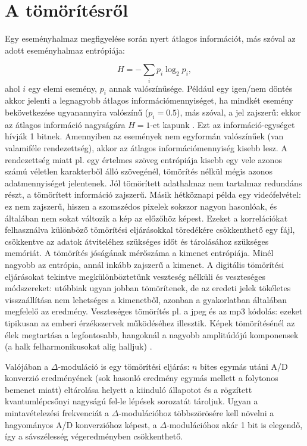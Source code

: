 \documentclass[12pt]{article}
\theoremstyle{plain}
\begin{document}
\section{A tömörítésről}

Egy eseményhalmaz megfigyelése során nyert átlagos információt, más szóval az adott eseményhalmaz entrópiája:

\begin{equation}
	H = - \sum_{i} p_i \log_2 p_i,
\end{equation}
ahol $i$ egy elemi esemény, $p_i$ annak valószínűsége. Például egy igen/nem döntés akkor jelenti a legnagyobb átlagos információmennyiséget, ha mindkét esemény bekövetkezése ugyanannyira valószínű ($p_i = 0.5$), más szóval, a jel zajszerű: ekkor az átlagos információ nagyságára $H = 1$-et kapunk \cite{Bagoly}. Ezt az információ-egységet hívják 1 bitnek. Amennyiben az események nem egyformán valószínűek (van valamiféle rendezettség), akkor az átlagos információmennyiség kisebb lesz. A rendezettség miatt pl. egy értelmes szöveg entrópiája kisebb egy vele azonos számú véletlen karakterből álló szövegénél, tömörítés nélkül mégis azonos adatmennyiséget jelentenek. Jól tömörített adathalmaz nem tartalmaz redundáns részt, a tömörített információ zajszerű. Másik hétköznapi példa egy videófelvétel: ez nem zajszerű, hiszen a szomszédos pixelek sokszor nagyon hasonlóak, és általában nem sokat változik a kép az előzőhöz képest. Ezeket a korrelációkat felhasználva különböző tömörítési eljárásokkal töredékére csökkenthető egy fájl, csökkentve az adatok átviteléhez szükséges időt és tárolásához szükséges memóriát. A tömörítés jóságának mérőszáma a kimenet entrópiája. Minél nagyobb az entrópia, annál inkább zajszerű a kimenet. A digitális tömörítési eljárásokat tekintve megkülönböztetünk veszteség nélküli és veszteséges módszereket: utóbbiak ugyan jobban tömörítenek, de az eredeti jelek tökéletes visszaállítása nem lehetséges a kimenetből, azonban a gyakorlatban általában megfelelő az eredmény. Veszteséges tömörítés pl. a jpeg és az mp3 kódolás: ezeket tipikusan az emberi érzékszervek működéséhez illesztik. Képek tömörítésénél az élek megtartása a legfontosabb, hangoknál a nagyobb amplitúdójú komponensek (a halk felharmonikusokat alig halljuk) \cite{Bagoly}.

Valójában a $\Delta$-moduláció is egy tömörítési eljárás: $n$ bites egymás utáni A/D konverzió eredményének (sok hasonló eredmény egymás mellett a folytonos bemenet miatt) eltárolása helyett a kiinduló állapotot és a rögzített kvantumlépcsőnyi nagyságú fel-le lépések sorozatát tároljuk. Ugyan a mintavételezési frekvenciát a $\Delta$-modulációhoz többszörösére kell növelni a hagyományos A/D konverzióhoz képest, a $\Delta$-modulációhoz akár 1 bit is elegendő, így a sávszélesség végeredményben csökkenthető. 
\end{document}
